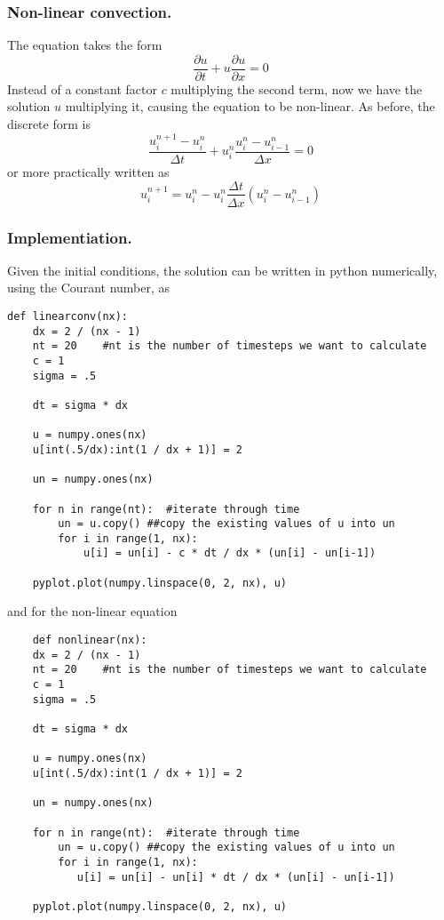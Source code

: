 \documentclass[../../../main.tex]{subfiles}
\begin{document}
\subsubsection{Non-linear convection.}
The equation takes the form
\begin{equation*}
    \frac{\partial u}{\partial t} + u \frac{\partial u}{\partial x} = 0
\end{equation*}
Instead of a constant factor $c$ multiplying the second term, now we have the solution $u$ multiplying it, causing the equation to be non-linear.
As before, the discrete form is 
\begin{equation*}
    \frac{u_i^{n+1}-u_i^n}{\Delta t} + u_i^n \frac{u_i^n-u_{i-1}^n}{\Delta x} = 0
\end{equation*}
or more practically written as 
\begin{equation*}
    u_i^{n+1} = u_i^n - u_i^n \frac{\Delta t}{\Delta x} (u_i^n - u_{i-1}^n)
\end{equation*}

\subsubsection*{Implementiation.}
Given the initial conditions, the solution can be written in python numerically, using the Courant number, as  
\begin{verbatim}
def linearconv(nx):
    dx = 2 / (nx - 1)
    nt = 20    #nt is the number of timesteps we want to calculate
    c = 1
    sigma = .5
    
    dt = sigma * dx

    u = numpy.ones(nx) 
    u[int(.5/dx):int(1 / dx + 1)] = 2

    un = numpy.ones(nx)

    for n in range(nt):  #iterate through time
        un = u.copy() ##copy the existing values of u into un
        for i in range(1, nx):
            u[i] = un[i] - c * dt / dx * (un[i] - un[i-1])
        
    pyplot.plot(numpy.linspace(0, 2, nx), u)
\end{verbatim}
and for the non-linear equation
\begin{verbatim}
    def nonlinear(nx):
    dx = 2 / (nx - 1)
    nt = 20    #nt is the number of timesteps we want to calculate
    c = 1
    sigma = .5
    
    dt = sigma * dx

    u = numpy.ones(nx) 
    u[int(.5/dx):int(1 / dx + 1)] = 2

    un = numpy.ones(nx)

    for n in range(nt):  #iterate through time
        un = u.copy() ##copy the existing values of u into un
        for i in range(1, nx):
           u[i] = un[i] - un[i] * dt / dx * (un[i] - un[i-1]) 
        
    pyplot.plot(numpy.linspace(0, 2, nx), u)
\end{verbatim}
\end{document}
